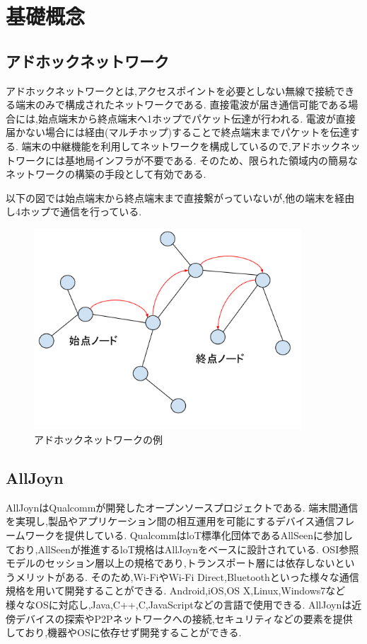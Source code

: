 \chapter{基礎概念}
\label{chap:concept}

\section{アドホックネットワーク}
アドホックネットワーク\cite{アドホック}とは,アクセスポイントを必要としない無線で接続できる端末のみで構成されたネットワークである.
直接電波が届き通信可能である場合には,始点端末から終点端末へ1ホップでパケット伝達が行われる.
電波が直接届かない場合には経由(マルチホップ)することで終点端末までパケットを伝達する.
端末の中継機能を利用してネットワークを構成しているので,アドホックネットワークには基地局インフラが不要である.
そのため、限られた領域内の簡易なネットワークの構築の手段として有効である.

以下の図では始点端末から終点端末まで直接繋がっていないが,他の端末を経由し4ホップで通信を行っている.

\begin{figure}[htbp]
\centering
\includegraphics[width=10cm]{fig/ad-hoc.pdf}
\caption{アドホックネットワークの例}
\end{figure}

\section{AllJoyn}
AllJoyn\cite{allseen}\cite{スライド}はQualcommが開発したオープンソースプロジェクトである.
端末間通信を実現し,製品やアプリケーション間の相互運用を可能にするデバイス通信フレームワークを提供している.
QualcommはloT標準化団体であるAllSeenに参加しており,AllSeenが推進するloT規格はAllJoynをベースに設計されている.
OSI参照モデルのセッション層以上の規格であり,トランスポート層には依存しないというメリットがある.
そのため,Wi-FiやWi-Fi Direct,Bluetoothといった様々な通信規格を用いて開発することができる.
Android,iOS,OS X,Linux,Windows7など様々なOSに対応し,Java,C++,C,JavaScriptなどの言語で使用できる.
AllJoynは近傍デバイスの探索やP2Pネットワークへの接続,セキュリティなどの要素を提供しており,機器やOSに依存せず開発することができる.

